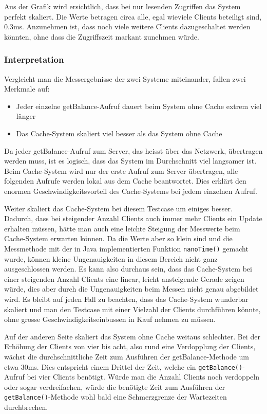 Aus der Grafik wird ersichtlich, dass bei nur lesenden Zu\-griffen das System perfekt skaliert. Die Werte betragen circa alle, egal wieviele Clients beteiligt sind, 0.3ms. Anzunehmen ist, dass noch viele weitere Clients dazugeschaltet werden könnten, ohne dass die Zugriffszeit markant zunehmen würde.


\subsubsection{Interpretation}

Vergleicht man die Messergebnisse der zwei Systeme miteinander, fallen zwei Merkmale auf:
\begin{itemize}
\item Jeder einzelne getBalance-Aufruf dauert beim System ohne Cache extrem viel länger
\item Das Cache-System skaliert viel besser als das System ohne Cache
\end{itemize}

Da jeder getBalance-Aufruf zum Server, das heisst über das Netzwerk,
übertragen werden muss, ist es logisch, dass das System im
Durchschnitt viel langsamer ist. Beim Cache-System wird nur der erste
Aufruf zum Server übertragen, alle folgenden Aufrufe werden lokal aus
dem Cache beantwortet. Dies erklärt den enormen
Geschwindigkeitsvorteil des Cache-Systems bei jedem einzelnen Aufruf.

Weiter skaliert das Cache-System bei diesem Testcase um einiges besser. Dadurch, dass bei steigender Anzahl Clients auch immer mehr Clients ein Update erhalten müssen, hätte man auch eine leichte Steigung der Messwerte beim Cache-System erwarten können. Da die Werte aber so klein sind und die Messmethode mit der in Java implementierten Funktion \texttt{nanoTime()} gemacht wurde, können kleine Ungenauigkeiten in diesem Bereich nicht ganz ausgeschlossen werden. Es kann also durchaus sein, dass das Cache-System bei einer steigenden Anzahl Clients eine linear, leicht ansteigende Gerade zeigen würde, dies aber durch die Ungenauigkeiten beim Messen nicht genau abgebildet wird. Es bleibt auf jeden Fall zu beachten, dass das Cache-System wunderbar skaliert und man den Testcase mit einer Vielzahl der Clients durchführen könnte, ohne grosse Geschwindigkeitseinbussen in Kauf nehmen zu müssen.

Auf der anderen Seite skaliert das System ohne Cache weitaus schlechter. Bei der Erhöhung der Clients von vier bis acht, also rund eine Verdopplung der Clients, wächst die durchschnittliche Zeit zum Ausführen der getBalance-Methode um etwa 30ms. Dies entspricht einem Drittel der Zeit, welche ein \texttt{getBalance()}-Aufruf bei vier Clients benötigt. Würde man die An\-zahl Cli\-ents noch verdoppeln oder sogar verdreifachen, würde die benötigte Zeit zum Ausführen der \texttt{getBalance()}-Methode wohl bald eine Schmerzgrenze der Wartezeiten durchbrechen.


